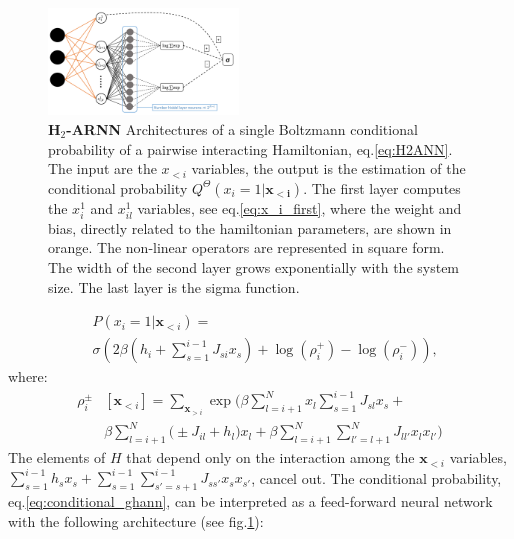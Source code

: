 \documentclass[aps,physrev,10pt,floatfix,reprint]{revtex4-2}
\begin{document}
\begin{figure}[!ht]
    \includegraphics[width=0.45\textwidth]{img/h2ARNN.pdf}
    \caption{ \textbf{H$_2$-ARNN} Architectures of a single Boltzmann conditional probability of a pairwise interacting Hamiltonian, eq.\ref{eq:H2ANN}. The input are the $x_{<i}$ variables, the output is the estimation of the conditional probability $Q^{\Theta} (x_i=1 | \mathbf{x_{<i}})$. The first layer computes the $x^1_i$ and $x^1_{il}$ variables, see eq.\ref{eq:x_i_first}, where the weight and bias, directly related to the hamiltonian parameters, are shown in orange. The non-linear operators are represented in square form. The width of the second layer grows exponentially with the system size. The last layer is the sigma function.}
    \label{fig:arch}
\end{figure}
\begin{equation}
    \label{eq:conditional_ghann}
    \begin{split}
    & P\left(x_{i}=1|\mathbf{x}_{<i}\right) = \\
    & \sigma\left( 2 \beta \left(h_i + \sum_{s=1}^{i-1} J_{si} x_s\right) +\log(\rho_i^+) - \log(\rho_i^-)
    \right),   
    \end{split}
\end{equation}
where:
\begin{equation}
    \begin{split}
    \rho_i^{\pm}&[\mathbf{x}_{<i}]  = \sum_{\mathbf{x}_{>i}}  \exp \bigg(
    \beta\sum_{l=i+1}^{N} x_l \sum_{s=1}^{i-1} J_{sl} x_s +\\
    &\beta\sum_{l=i+1}^{N}\big( \pm J_{il}  + h_l \big) x_l 
    + \beta\sum_{l=i+1}^{N}\sum_{l'=l+1}^{N} J_{ll'} x_l x_{l'} \bigg)
\end{split}
\label{eq:rho_ghann}
\end{equation}
The elements of $H$ that depend only on the interaction among the $\mathbf{x}_{<i}$ variables, $\sum_{s=1}^{i-1} h_s x_s + \sum_{s=1}^{i-1}\sum_{s'=s+1}^{i-1} J_{ss'} x_{s} x_{s'}$, cancel out.
The conditional probability, eq.\ref{eq:conditional_ghann}, can be interpreted as a feed-forward neural network with the following architecture (see fig.\ref{fig:arch}):
\end{document}

